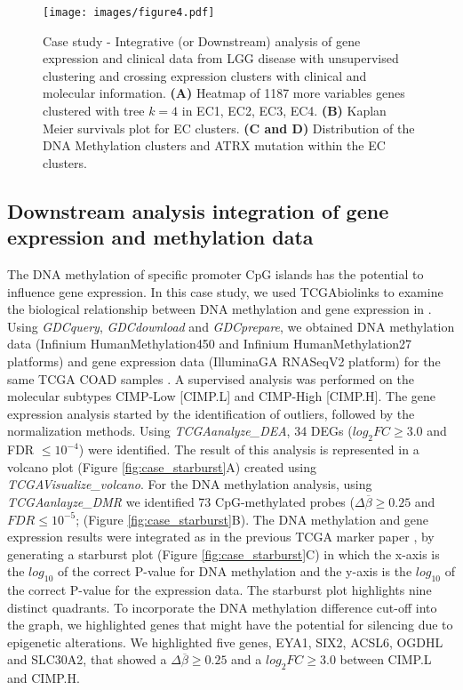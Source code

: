 \begin{figure}
\centering
\texttt{[image: images/figure4.pdf]}
\caption[Case study - LGG downstream analysis with gene expression]{Case study - Integrative (or Downstream) analysis of gene expression and clinical data from LGG disease with unsupervised clustering and crossing expression clusters with clinical and molecular information. \textbf{(A)} Heatmap of 1187 more variables genes clustered with tree $k = 4$ in EC1, EC2, EC3, EC4. \textbf{(B)} Kaplan Meier survivals plot for EC clusters. \textbf{(C and D)} Distribution of the DNA Methylation clusters and ATRX mutation within the EC clusters.}
\label{fig:caseexp}
\end{figure}

\subsection{Downstream analysis integration of gene expression and methylation data} \label{subsec:analysis_tcgbiolinks3}

The DNA methylation of specific promoter CpG islands has the potential to influence gene expression.
In this case study, we used TCGAbiolinks to examine the biological relationship between DNA methylation
and gene expression in . Using \textit{GDCquery}, \textit{GDCdownload}
and \textit{GDCprepare}, we obtained DNA methylation data (Infinium HumanMethylation450 and Infinium
HumanMethylation27 platforms) and gene expression data (IlluminaGA RNASeqV2 platform) for the same
TCGA COAD samples \cite{cancer2012comprehensive}. A supervised analysis was performed on the molecular
subtypes CIMP-Low [CIMP.L] and CIMP-High [CIMP.H].
The gene expression analysis started by the identification of outliers, followed by the normalization methods.
 Using \textit{TCGAanalyze\_DEA}, 34 DEGs ($log_2FC\geq 3.0$ and FDR $\leq 10^{-4}$) were identified.
 The result of this analysis is represented in a volcano plot (Figure \ref{fig:case_starburst}A)
 created using \textit{TCGAVisualize\_volcano}.
For the DNA methylation analysis,
using \textit{TCGAanlayze\_DMR} we identified 73 CpG-methylated probes ($\Delta\overline{\beta}\geq 0.25$ and  $FDR \leq 10^{-5}$;  (Figure \ref{fig:case_starburst}B). The DNA methylation and gene expression results were integrated as in the previous TCGA marker paper \cite{noushmehr2010identification,cancer2012comprehensive}, by generating a starburst plot (Figure \ref{fig:case_starburst}C) in which the x-axis is the $log_{10}$ of the correct P-value for DNA methylation and the y-axis is the $log_{10}$ of the correct P-value for the expression data.
The starburst plot highlights nine distinct quadrants.
To incorporate the DNA methylation difference cut-off into the  graph,
we highlighted genes that might have the potential for silencing due to epigenetic alterations.
 We highlighted five genes, EYA1, SIX2, ACSL6, OGDHL and SLC30A2, that showed a $\Delta\overline{\beta}\geq0.25$
 and a $log_2FC\geq 3.0$ between CIMP.L and CIMP.H.

